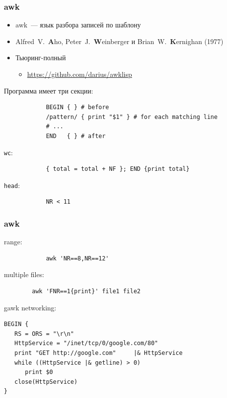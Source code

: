 \documentclass[hyperref={unicode=true}]{beamer}
\begin{document}
\begin{frame}[fragile]
	\frametitle{awk}
	\begin{itemize}
		\item awk~--- язык разбора записей по шаблону
		\item Alfred~V.~\textbf{A}ho, Peter~J.~\textbf{W}einberger и Brian~W.~\textbf{K}ernighan (1977)
		\item Тьюринг-полный
			\begin{itemize}
				\item \url{https://github.com/darius/awklisp}
			\end{itemize}
	\end{itemize}

	Программа имеет три секции:

	\begin{addmargin}[1em]{0em}
		\begin{verbatim}
			BEGIN { } # before
			/pattern/ { print "$1" } # for each matching line
			# ...
			END   { } # after
		\end{verbatim}
	\end{addmargin}

		\texttt{wc}:
	\begin{addmargin}[1em]{0em}
		\begin{verbatim}
			{ total = total + NF }; END {print total}
		\end{verbatim}
	\end{addmargin}

	\texttt{head}:
	\begin{addmargin}[1em]{0em}
		\begin{verbatim}
			NR < 11
		\end{verbatim}
	\end{addmargin}
\end{frame}

\begin{frame}[fragile]
	\frametitle{awk}
	range:
	\begin{addmargin}[1em]{0em}
		\begin{verbatim}
			awk 'NR==8,NR==12'
		\end{verbatim}
	\end{addmargin}

	multiple files:
	\begin{addmargin}[1em]{0em}
		\begin{verbatim}
		awk 'FNR==1{print}' file1 file2
		\end{verbatim}
	\end{addmargin}

	gawk networking:
	\begin{addmargin}[1em]{0em}
		\begin{verbatim}
BEGIN {
   RS = ORS = "\r\n"
   HttpService = "/inet/tcp/0/google.com/80"
   print "GET http://google.com"     |& HttpService
   while ((HttpService |& getline) > 0)
      print $0
   close(HttpService)
}
		\end{verbatim}
	\end{addmargin}
\end{frame}
\end{document}
